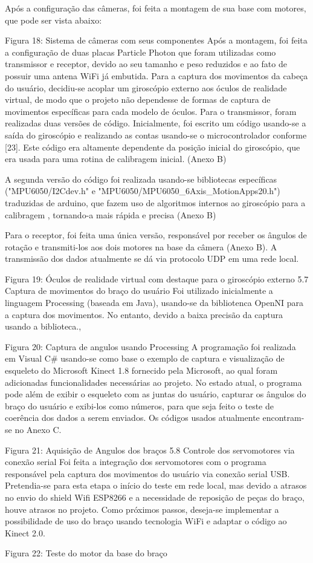 Após a configuração das câmeras, foi feita a montagem de sua base com motores, que pode ser vista abaixo: 


Figura 18: Sistema de câmeras com seus componentes
Após a montagem, foi feita a configuração de duas placas Particle Photon que foram utilizadas como transmissor e receptor, devido ao seu tamanho e peso reduzidos e ao fato de possuir uma antena WiFi já embutida.
Para a captura dos movimentos da cabeça do usuário, decidiu-se acoplar um giroscópio externo aos óculos de realidade virtual, de modo que o projeto não dependesse de formas de captura de movimentos específicas para cada modelo de óculos.
Para o transmissor, foram realizadas duas versões de código.
Inicialmente, foi  escrito um código usando-se a saída do giroscópio e realizando as contas usando-se o microcontrolador conforme [23]. Este código era altamente dependente da posição inicial do giroscópio, que era usada para uma rotina de calibragem inicial. (Anexo B)


A segunda versão do código foi realizada usando-se bibliotecas específicas ("MPU6050/I2Cdev.h" e "MPU6050/MPU6050\_6Axis\_MotionApps20.h") traduzidas de arduino, que fazem uso de algoritmos internos ao giroscópio para a calibragem , tornando-a mais rápida e precisa (Anexo B)

Para o receptor, foi feita uma única versão, responsável por receber os ângulos de rotação e transmiti-los aos dois motores na base da câmera (Anexo B).
A transmissão dos dados atualmente se dá via protocolo UDP em uma rede local.

Figura 19: Óculos de realidade virtual com destaque para o giroscópio externo
5.7	Captura de movimentos do braço do usuário
Foi utilizado inicialmente a linguagem Processing (baseada em Java), usando-se da bibliotenca OpenNI para a captura dos movimentos. No entanto, devido a baixa precisão da captura usando a biblioteca.,


Figura 20: Captura de angulos usando Processing
A programação foi realizada em Visual C\# usando-se como base o exemplo de captura e visualização de esqueleto do Microsoft Kinect 1.8 fornecido pela Microsoft, ao qual foram adicionadas funcionalidades necessárias ao projeto. No estado atual, o programa pode além de exibir o esqueleto com as juntas do usuário, capturar os ângulos do braço do usuário e exibi-los como números, para que seja feito o teste de coerência dos dados a serem enviados. Os códigos usados atualmente encontram-se no Anexo C.

Figura 21: Aquisição de Angulos dos braços
5.8	Controle dos servomotores via conexão serial
Foi feita a integração dos servomotores com o programa responsável pela captura dos movimentos do usuário via conexão serial USB. Pretendia-se para esta etapa o início do teste em rede local, mas devido a atrasos no envio do shield Wifi ESP8266 e a necessidade de reposição de peças do braço, houve atrasos no projeto. 
Como próximos passos, deseja-se implementar a possibilidade de uso do braço usando tecnologia WiFi e adaptar o código ao Kinect 2.0. 

Figura 22: Teste do motor da base do braço

		
		
		